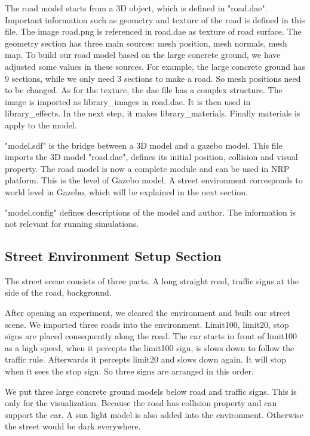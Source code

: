 The road model starts from a 3D object, which is defined in "road.dae". Important information such as geometry and texture of the road is defined in this file. The image road.png is referenced in road.dae as texture of road surface. The geometry section has three main sources: mesh position, mesh normals, mesh map. To build our road model based on the large concrete ground, we have adjusted some values in these sources. For example, the large concrete ground has 9 sections, while we only need 3 sections to make a road. So mesh positions need to be changed. As for the texture, the dae file has a complex structure. The image is imported as library\_images in road.dae. It is then used in library\_effects. In the next step, it makes library\_materials. Finally materials is apply to the model. 


"model.sdf" is the bridge between a 3D model and a gazebo model. This file imports the 3D model "road.dae", defines its initial position, collision and visual property. The road model is now a complete module and can be used in NRP platform. This is the level of Gazebo model. A street environment corresponds to world level in Gazebo, which will be explained in the next section.

"model.config" defines descriptions of the model and author. The information is not relevant for running simulations. 

\subsection{Street Environment Setup Section}
The street scene consists of three parts. A long straight road, traffic signs at the side of the road, background.

After opening an experiment, we cleared the environment and built our street scene. We imported three roads into the environment. Limit100, limit20, stop signs are placed consequently along the road. The car starts in front of limit100 as a high speed, when it percepts the limit100 sign, is slows down to follow the traffic rule. Afterwards it percepts limit20 and slows down again. It will stop when it sees the stop sign. So three signs are arranged in this order.


We put three large concrete ground models below road and traffic signs. This is only for the visualization. Because the road has collision property and can support the car. A sun light model is also added into the environment. Otherwise the street would be dark everywhere.

